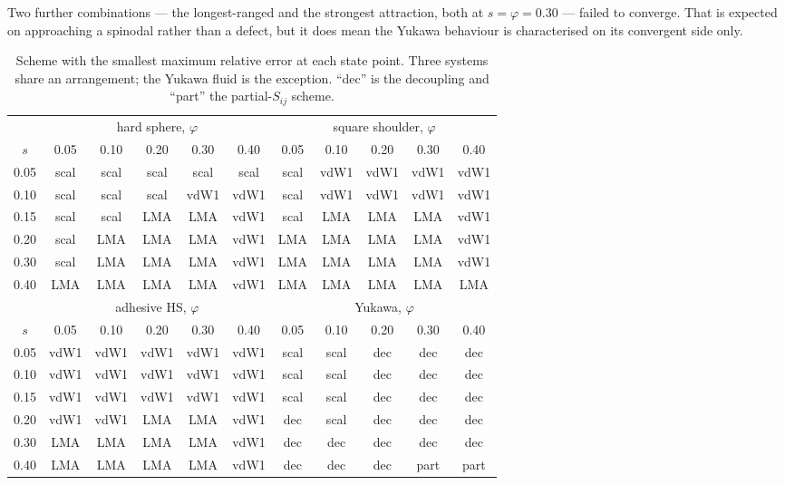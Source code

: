 Two further combinations --- the longest-ranged and the strongest attraction,
both at $s = \varphi = 0.30$ --- failed to converge. That is expected on
approaching a spinodal rather than a defect, but it does mean the Yukawa
behaviour is characterised on its convergent side only.

\begin{table}[htbp]
\centering
\caption{Scheme with the smallest maximum relative error at each state point.
Three systems share an arrangement; the Yukawa fluid is the exception.
``dec'' is the decoupling and ``part'' the partial-$S_{ij}$ scheme.}
\label{tab:map}
\small
\begin{tabular}{c|ccccc|ccccc}
\toprule
& \multicolumn{5}{c|}{hard sphere, $\varphi$}
& \multicolumn{5}{c}{square shoulder, $\varphi$}\\
$s$ & 0.05 & 0.10 & 0.20 & 0.30 & 0.40 & 0.05 & 0.10 & 0.20 & 0.30 & 0.40\\
\midrule
0.05 & scal & scal & scal & scal & scal & scal & vdW1 & vdW1 & vdW1 & vdW1\\
0.10 & scal & scal & scal & vdW1 & vdW1 & scal & vdW1 & vdW1 & vdW1 & vdW1\\
0.15 & scal & scal & LMA  & LMA  & vdW1 & scal & LMA  & LMA  & LMA  & vdW1\\
0.20 & scal & LMA  & LMA  & LMA  & vdW1 & LMA  & LMA  & LMA  & LMA  & vdW1\\
0.30 & scal & LMA  & LMA  & LMA  & vdW1 & LMA  & LMA  & LMA  & LMA  & vdW1\\
0.40 & LMA  & LMA  & LMA  & LMA  & vdW1 & LMA  & LMA  & LMA  & LMA  & LMA\\
\midrule
& \multicolumn{5}{c|}{adhesive HS, $\varphi$}
& \multicolumn{5}{c}{Yukawa, $\varphi$}\\
$s$ & 0.05 & 0.10 & 0.20 & 0.30 & 0.40 & 0.05 & 0.10 & 0.20 & 0.30 & 0.40\\
\midrule
0.05 & vdW1 & vdW1 & vdW1 & vdW1 & vdW1 & scal & scal & dec  & dec  & dec\\
0.10 & vdW1 & vdW1 & vdW1 & vdW1 & vdW1 & scal & scal & dec  & dec  & dec\\
0.15 & vdW1 & vdW1 & vdW1 & vdW1 & vdW1 & scal & scal & dec  & dec  & dec\\
0.20 & vdW1 & vdW1 & LMA  & LMA  & vdW1 & dec  & scal & dec  & dec  & dec\\
0.30 & LMA  & LMA  & LMA  & LMA  & vdW1 & dec  & dec  & dec  & dec  & dec\\
0.40 & LMA  & LMA  & LMA  & LMA  & vdW1 & dec  & dec  & dec  & part & part\\
\bottomrule
\end{tabular}
\end{table}

